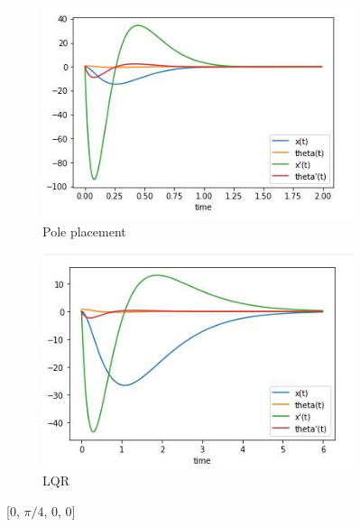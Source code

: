 \documentclass[12pt,letterpaper]{article}
\begin{document}
    \begin{figure}[htb]
        \begin{subfigure}{.5\textwidth}
            \centering
            \includegraphics[width=1\linewidth]{images/output/poles/0-pi_4-0-0.jpg}
            \caption{Pole placement}
            \label{fig:pole_3}
        \end{subfigure}
        \begin{subfigure}{.5\textwidth}
          \centering
          \includegraphics[width=1\linewidth]{images/output/0-pi_4-0-0.jpg}
          \caption{LQR}
        \label{fig:lqr_3}
        \end{subfigure}
    \caption{[0, $\pi / 4$, 0, 0]}
    \end{figure}
        
\end{document}
